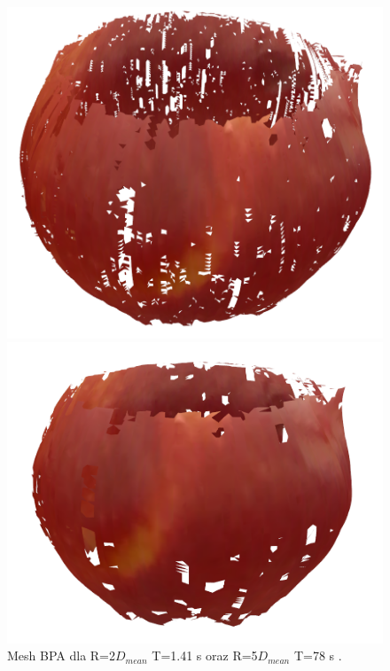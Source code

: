 \begin{figure}[H]
\centering
    \begin{minipage}[b]{0.45\linewidth}
        \includegraphics[scale=0.3]{bpaApple2x.PNG}
    \end{minipage}
\quad
    \begin{minipage}[b]{0.45\linewidth}
        \includegraphics[scale=0.3]{bpaApple5x.PNG}
    \end{minipage}
\caption{Mesh BPA dla R=2$D_{mean}$ T=1.41 s oraz R=5$D_{mean}$ T=78 s .}
\label{fig:appleComparison1}
\end{figure}

